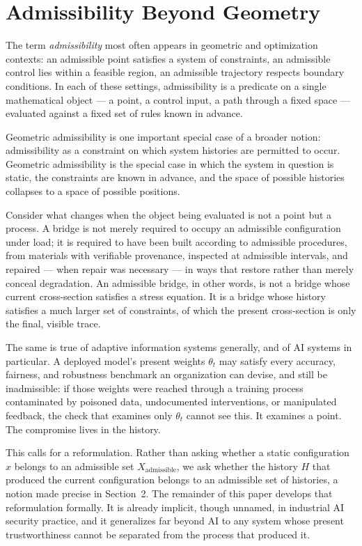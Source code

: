 \documentclass[11pt]{article}
\begin{document}
\section{Admissibility Beyond Geometry}

The term \emph{admissibility} most often appears in geometric and optimization contexts: an admissible point satisfies a system of constraints, an admissible control lies within a feasible region, an admissible trajectory respects boundary conditions. In each of these settings, admissibility is a predicate on a single mathematical object --- a point, a control input, a path through a fixed space --- evaluated against a fixed set of rules known in advance.

Geometric admissibility is one important special case of a broader notion: admissibility as a constraint on which system histories are permitted to occur. Geometric admissibility is the special case in which the system in question is static, the constraints are known in advance, and the space of possible histories collapses to a space of possible positions.

Consider what changes when the object being evaluated is not a point but a process. A bridge is not merely required to occupy an admissible configuration under load; it is required to have been built according to admissible procedures, from materials with verifiable provenance, inspected at admissible intervals, and repaired --- when repair was necessary --- in ways that restore rather than merely conceal degradation. An admissible bridge, in other words, is not a bridge whose current cross-section satisfies a stress equation. It is a bridge whose history satisfies a much larger set of constraints, of which the present cross-section is only the final, visible trace.

The same is true of adaptive information systems generally, and of AI systems in particular. A deployed model's present weights $\theta_t$ may satisfy every accuracy, fairness, and robustness benchmark an organization can devise, and still be inadmissible: if those weights were reached through a training process contaminated by poisoned data, undocumented interventions, or manipulated feedback, the check that examines only $\theta_t$ cannot see this. It examines a point. The compromise lives in the history.

This calls for a reformulation. Rather than asking whether a static configuration $x$ belongs to an admissible set $X_{\mathrm{admissible}}$, we ask whether the history $H$ that produced the current configuration belongs to an admissible set of histories, a notion made precise in Section~2. The remainder of this paper develops that reformulation formally. It is already implicit, though unnamed, in industrial AI security practice, and it generalizes far beyond AI to any system whose present trustworthiness cannot be separated from the process that produced it.
\end{document}
